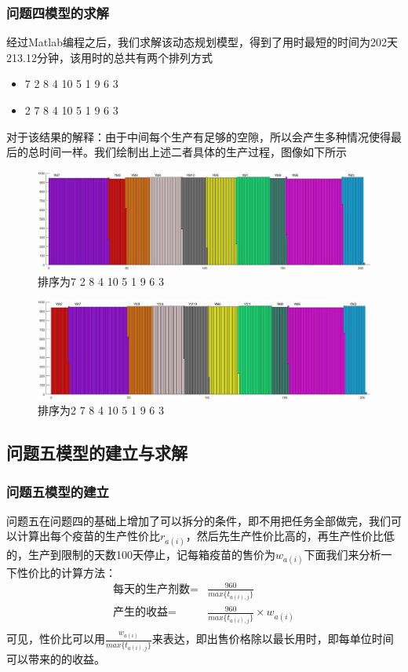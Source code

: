 \documentclass{ctexart}
\begin{document}
\subsubsection{问题四模型的求解}
经过Matlab编程之后，我们求解该动态规划模型，得到了用时最短的时间为202天213.12分钟，该用时的总共有两个排列方式
\begin{itemize}
\centering
    \item 7     2     8     4    10     5     1     9     6     3
    \item 2     7     8     4    10     5     1     9     6     3
\end{itemize}
对于该结果的解释：由于中间每个生产有足够的空隙，所以会产生多种情况使得最后的总时间一样。我们绘制出上述二者具体的生产过程，图像如下所示
\begin{figure}[h]
\centering
\includegraphics[width=0.8\linewidth]{A4图片/A41.jpg}
\caption{排序为7 2 8 4 10 5 1 9 6 3}
\label{A41}
\end{figure}
\begin{figure}[h]
\centering
\includegraphics[width=0.8\linewidth]{A4图片/A42.jpg}
\caption{排序为2 7 8 4 10 5 1 9 6 3}
\label{A42}
\end{figure}

\newpage
\subsection{问题五模型的建立与求解}
\subsubsection{问题五模型的建立}
问题五在问题四的基础上增加了可以拆分的条件，即不用把任务全部做完，我们可以计算出每个疫苗的生产性价比$r_{a(i)}$，然后先生产性价比高的，再生产性价比低的，生产到限制的天数100天停止\cite{ref1}，记每箱疫苗的售价为$w_{a(i)}$下面我们来分析一下性价比的计算方法：
\begin{align}
    \mbox{每天的生产剂数} =& \frac{960}{max \{t_{a(i),j}\}}\nonumber\\
    \mbox{产生的收益} =& \frac{960}{max \{t_{a(i),j}\}} \times w_{a(i)}\nonumber\\
\end{align}
可见，性价比可以用$\frac{w_{a(i)}}{max \{t_{a(i),j}\}}$来表达，即出售价格除以最长用时，即每单位时间可以带来的的收益。
\end{document}
